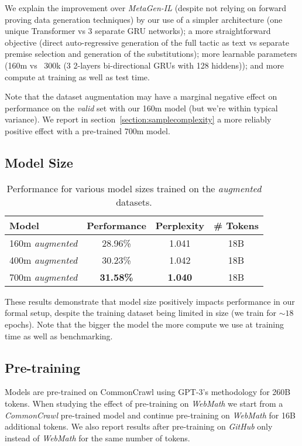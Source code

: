 \documentclass{article}
\begin{document}
We explain the improvement over \textit{MetaGen-IL} (despite not relying on forward proving data generation techniques) by our use of a simpler architecture (one unique Transformer vs 3 separate GRU networks); a more straightforward objective (direct auto-regressive generation of the full tactic as text vs separate premise selection and generation of the substitutions); more learnable parameters (160m vs ~300k (3 2-layers bi-directional GRUs with 128 hiddens)); and more compute at training as well as test time.

Note that the dataset augmentation may have a marginal negative effect on performance on the \textit{valid} set with our 160m model (but we're within typical variance). We report in section~\ref{section:samplecomplexity} a more reliably positive effect with a pre-trained 700m model.

\subsection{Model Size}

\begin{table}[ht]
\caption{Performance for various model sizes trained on the \textit{augmented} datasets.} 
\centering
\begin{tabular}{ |l|c|c|c| }
    \hline
    Model & Performance & Perplexity & \# Tokens \\
    \hline
    160m \textit{augmented} & 28.96\% & 1.041 & 18B \\
    400m \textit{augmented} & 30.23\% & 1.042 & 18B \\
    700m \textit{augmented} & \textbf{31.58\%} & \textbf{1.040} & 18B \\
    \hline
\end{tabular}
\label{table:modelsize}
\end{table}
    
These results demonstrate that model size positively impacts performance in our formal setup, despite the training dataset being limited in size (we train for $\sim 18$ epochs). Note that the bigger the model the more compute we use at training time as well as benchmarking.

\subsection{Pre-training}

Models are pre-trained on CommonCrawl using GPT-3's\cite{brown2020language} methodology for 260B tokens. When studying the effect of pre-training on \textit{WebMath} we start from a \textit{CommonCrawl} pre-trained model and continue pre-training on \textit{WebMath} for 16B additional tokens. We also report results after pre-training on \textit{GitHub} only instead of \textit{WebMath} for the same number of tokens.  
\end{document}
